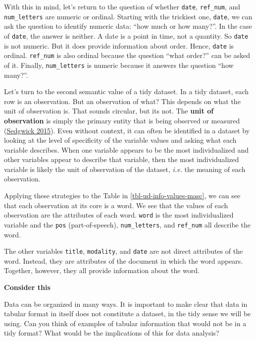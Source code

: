 \documentclass[
  letterpaper,
  DIV=11,
  numbers=noendperiod]{scrreport}
\theoremstyle{definition}
\theoremstyle{remark}
\begin{document}
With this in mind, let's return to the question of whether
\texttt{date}, \texttt{ref\_num}, and \texttt{num\_letters} are numeric
or ordinal. Starting with the trickiest one, \texttt{date}, we can ask
the question to identify numeric data: ``how much or how many?''. In the
case of \texttt{date}, the answer is neither. A date is a point in time,
not a quantity. So \texttt{date} is not numeric. But it does provide
information about order. Hence, \texttt{date} is ordinal.
\texttt{ref\_num} is also ordinal because the question ``what order?''
can be asked of it. Finally, \texttt{num\_letters} is numeric because it
answers the question ``how many?''.

Let's turn to the second semantic value of a tidy dataset. In a tidy
dataset, each row is an observation. But an observation of what? This
depends on what the unit of observation is. That sounds circular, but
its not. The \textbf{unit of observation} is simply the primary entity
that is being observed or measured
(\protect\hyperlink{ref-Sedgwick2015}{Sedgwick 2015}). Even without
context, it can often be identified in a dataset by looking at the level
of specificity of the variable values and asking what each variable
describes. When one variable appears to be the most individualized and
other variables appear to describe that variable, then the most
individualized variable is likely the unit of observation of the
dataset, \emph{i.e.} the meaning of each observation.

Applying these strategies to the Table in \ref{tbl-ud-info-values-masc},
we can see that each observation at its core is a word. We see that the
values of each observation are the attributes of each word.
\texttt{word} is the most individualized variable and the \texttt{pos}
(part-of-speech), \texttt{num\_letters}, and \texttt{ref\_num} all
describe the word.

The other variables \texttt{title}, \texttt{modality}, and \texttt{date}
are not direct attributes of the word. Instead, they are attributes of
the document in which the word appears. Together, however, they all
provide information about the word.

\begin{tcolorbox}[enhanced jigsaw, leftrule=.75mm, bottomrule=.15mm, opacityback=0, breakable, left=2mm, colback=white, toprule=.15mm, arc=.35mm, rightrule=.15mm]

\textbf{ Consider this}

Data can be organized in many ways. It is important to make clear that
data in tabular format in itself does not constitute a dataset, in the
tidy sense we will be using. Can you think of examples of tabular
information that would not be in a tidy format? What would be the
implications of this for data analysis?

\end{tcolorbox}
\end{document}
